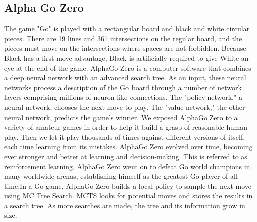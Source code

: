 \documentclass[10pt,twocolumn]{article}
\begin{document}
\subsection{Alpha Go Zero}
    The game "Go" is played with a rectangular board and black and white circular pieces. There are 19 lines and 361 intersections on the regular board, and the pieces must move on the intersections where spaces are not forbidden. Because Black has a first move advantage, Black is artificially required to give White an eye at the end of the game. AlphaGo Zero is a computer software that combines a deep neural network with an advanced search tree. As an input, these neural networks process a description of the Go board through a number of network layers comprising millions of neuron-like connections. The "policy network," a neural network, chooses the next move to play. The "value network," the other neural network, predicts the game's winner. We exposed AlphaGo Zero to a variety of amateur games in order to help it build a grasp of reasonable human play. Then we let it play thousands of times against different versions of itself, each time learning from its mistakes. AlphaGo Zero evolved over time, becoming ever stronger and better at learning and decision-making. This is referred to as reinforcement learning. AlphaGo Zero went on to defeat Go world champions in many worldwide arenas, establishing himself as the greatest Go player of all time.In a Go game, AlphaGo Zero builds a local policy to sample the next move using MC Tree Search. MCTS looks for potential moves and stores the results in a search tree. As more searches are made, the tree and its information grow in size. 
    
    
\end{document}
